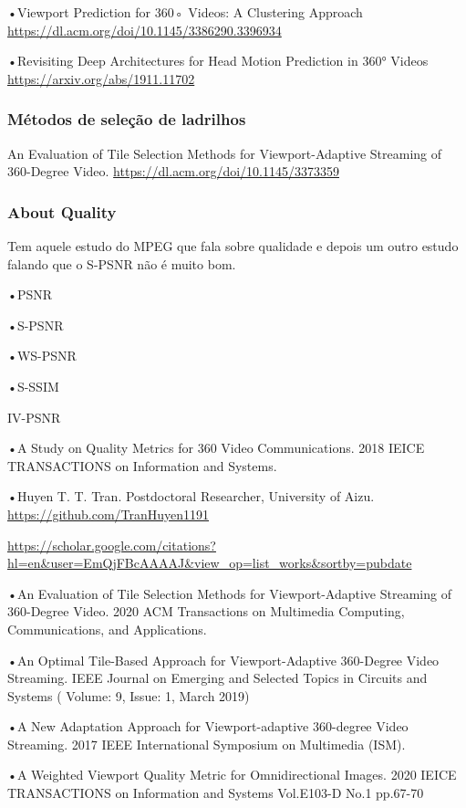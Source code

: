 •Viewport Prediction for 360◦ Videos: A Clustering Approach
\url{https://dl.acm.org/doi/10.1145/3386290.3396934}

•Revisiting Deep Architectures for Head Motion Prediction in 360° Videos
\url{https://arxiv.org/abs/1911.11702}

\subsubsection{Métodos de seleção de ladrilhos}

An Evaluation of Tile Selection Methods for Viewport-Adaptive Streaming of 360-Degree Video. \url{https://dl.acm.org/doi/10.1145/3373359}

\subsubsection{About Quality}

Tem aquele estudo do MPEG que fala sobre qualidade e depois um outro estudo falando que o S-PSNR não é muito bom.

•PSNR

•S-PSNR

•WS-PSNR

•S-SSIM

IV-PSNR

•A Study on Quality Metrics for 360 Video Communications. 2018 IEICE TRANSACTIONS on Information and Systems.

•Huyen T. T. Tran. Postdoctoral Researcher, University of Aizu. \url{https://github.com/TranHuyen1191}

\url{https://scholar.google.com/citations?hl=en&user=EmQjFBcAAAAJ&view_op=list_works&sortby=pubdate}

•An Evaluation of Tile Selection Methods for Viewport-Adaptive Streaming of 360-Degree Video. 2020 ACM Transactions on Multimedia Computing, Communications, and Applications. 

•An Optimal Tile-Based Approach for Viewport-Adaptive 360-Degree Video Streaming.  IEEE Journal on Emerging and Selected Topics in Circuits and Systems ( Volume: 9, Issue: 1, March 2019)

•A New Adaptation Approach for Viewport-adaptive 360-degree Video Streaming. 2017 IEEE International Symposium on Multimedia (ISM).

•A Weighted Viewport Quality Metric for Omnidirectional Images. 2020 IEICE TRANSACTIONS on Information and Systems   Vol.E103-D   No.1   pp.67-70

